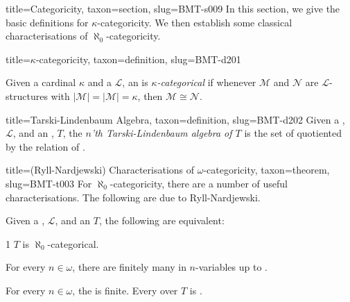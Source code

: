 \documentclass[a4paper]{article}
\begin{document}
\begin{tree}{title={Categoricity}, taxon={section}, slug={BMT-s009}}
In this section, we give the basic definitions for \(\kappa\)-categoricity. We then establish some classical characterisations of \(\aleph _0\)-categoricity.
\begin{tree}{title={\(\kappa\)-categoricity}, taxon={definition}, slug={BMT-d201}}

    Given a cardinal \(\kappa\) and a  \(\mathcal {L}\), an  is \emph{\(\kappa\)-categorical} if whenever \(\mathcal {M}\) and \(\mathcal {N}\) are \(\mathcal {L}\)-structures with \(| \mathcal {M}|=| \mathcal {M}|= \kappa\), then \(\mathcal {M}  \cong   \mathcal {N}\). 

\end{tree}

\begin{tree}{title={Tarski-Lindenbaum Algebra}, taxon={definition}, slug={BMT-d202}}
Given a , \(\mathcal {L}\), and an , \(T\), the \emph{\(n\)'th Tarski-Lindenbaum algebra of \(T\)} is the set of  quotiented by the relation of .
\end{tree}

\begin{tree}{title={(Ryll-Nardjewski) Characterisations of \(\omega\)-categoricity}, taxon={theorem}, slug={BMT-t003}}
For \(\aleph _0\)-categoricity, there are a number of useful characterisations. The following are due to Ryll-Nardjewski.\par{Given a , \(\mathcal {L}\), and an  \(T\), the following are equivalent:}\par{1 \(T\) is \(\aleph _0\)-categorical.}\par{For every \(n \in   \omega\), there are finitely many  in \(n\)-variables up to .}\par{For every \(n \in   \omega\), the  is finite. 
Every  over \(T\) is . }
\end{tree}

\end{tree}
\end{document}

